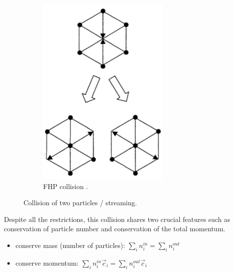 \begin{figure}[H]
\begin{subfigure}[h]{0.3\textwidth}
    \includegraphics[width=\textwidth]{img/fig5.png}
    \caption{FHP collision \cite{succi}.}
  \end{subfigure}
  \caption{Collision of two particles / streaming.}\label{fig:hpp-fhp-collision}
\end{figure}

Despite all the restrictions, this collision shares two crucial features such as conservation of particle number and conservation of the total momentum.

\begin{itemize}
\item conserve mass (number of particles): $ \sum_i n_i^{in} = \sum_i n_i^{out} $
\item conserve momentum: $ \sum_i n_i^{in} \vec{c}_{i} = \sum_i n_i^{out} \vec{c}_{i} $
\end{itemize}

